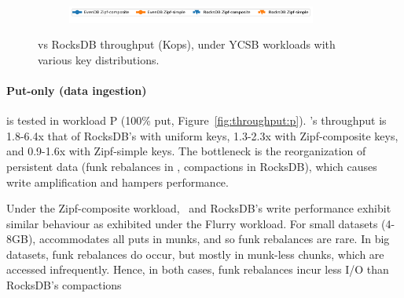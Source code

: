 \begin{figure}[tb]
\begin{subfigure}{\linewidth}
\centerline{
\includegraphics[width=0.9\textwidth]{figs/legend.pdf}
\vspace{-5mm}
}
\end{subfigure}
\caption{
{\sys\/ vs RocksDB throughput (Kops), under YCSB workloads with various key distributions.}
}
\label{fig:throughput}
\end{figure}


\paragraph{ Put-only (data ingestion)} is tested in workload
{P} (100\% put, Figure~\ref{fig:throughput:p}). 
\sys's throughput is 1.8-6.4x that of RocksDB's with uniform keys, 1.3-2.3x with Zipf-composite keys, 
and 0.9-1.6x with Zipf-simple keys. The bottleneck is the reorganization of persistent data  
(funk rebalances in \sys, compactions in RocksDB), which causes write amplification and hampers performance. 
 
 Under the Zipf-composite workload, \sys\ and RocksDB's write performance exhibit similar behaviour as exhibited under the Flurry workload.
For small datasets (4-8GB), \sys\/ accommodates 
all puts in munks, and so funk rebalances are rare. In big datasets, funk rebalances do occur, but mostly in 
munk-less chunks, which are accessed infrequently. Hence, in both cases, funk rebalances incur less I/O than RocksDB's compactions

